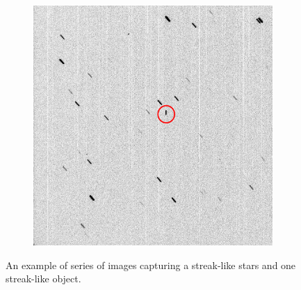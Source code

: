 \begin{figure}[!h]
\begin{subfigure}{.3\textwidth}
        \label{fig:streakstreak2}
    \end{subfigure}
    \hfill
    \begin{subfigure}{.3\textwidth}
        \centering
        \includegraphics[width=\textwidth]{images/StreakStreak3.png}
        \label{fig:streakstreak3}
    \end{subfigure}
    \hfill
    \caption{An example of series of images capturing a streak-like stars and one streak-like object. }
    \label{fig:streakstreak0}
\end{figure}
